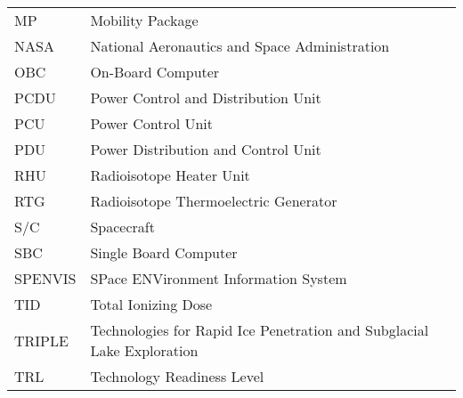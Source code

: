 \begin{longtable}[l]{ll}
MP		& Mobility Package \\
NASA    &   National Aeronautics and Space Administration \\		
OBC		& On-Board Computer \\
PCDU    & Power Control and Distribution Unit \\
PCU     & Power Control Unit \\
PDU     & Power Distribution and Control Unit \\
RHU		& Radioisotope Heater Unit\\
RTG     & Radioisotope Thermoelectric Generator \\
S/C     & Spacecraft\\
SBC		& Single Board Computer \\
SPENVIS	&	SPace ENVironment Information System	\\
TID		& Total Ionizing Dose \\
TRIPLE 	& Technologies for Rapid Ice Penetration and Subglacial Lake Exploration \\
TRL     & Technology Readiness Level \\



\end{longtable}

\clearpage






